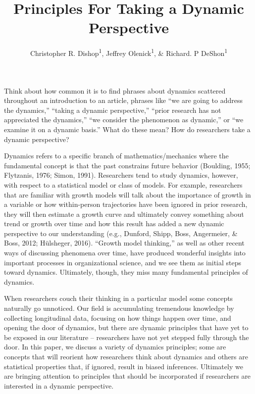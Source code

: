 \documentclass[english,,man]{apa6}
\title{Principles For Taking a Dynamic Perspective}
\author{Christopher R. Dishop\textsuperscript{1}, Jeffrey
Olenick\textsuperscript{1}, \& Richard. P DeShon\textsuperscript{1}}
\date{}
\affiliation{
\vspace{0.5cm}
\textsuperscript{1} Michigan State University}
\theoremstyle{definition}
\theoremstyle{definition}
\theoremstyle{definition}
\theoremstyle{remark}
\begin{document}
\maketitle

Think about how common it is to find phrases about dynamics scattered
throughout an introduction to an article, phrases like \enquote{we are
going to address the dynamics,} \enquote{taking a dynamic perspective,}
\enquote{prior research has not appreciated the dynamics,} \enquote{we
consider the phenomenon as dynamic,} or \enquote{we examine it on a
dynamic basis.} What do these mean? How do researchers take a dynamic
perspective?

Dynamics refers to a specific branch of mathematics/mechanics where the
fundamental concept is that the past constrains future behavior
(Boulding, 1955; Flytzanis, 1976; Simon, 1991). Researchers tend to
study dynamics, however, with respect to a statistical model or class of
models. For example, researchers that are familiar with growth models
will talk about the importance of growth in a variable or how
within-person trajectories have been ignored in prior research, they
will then estimate a growth curve and ultimately convey something about
trend or growth over time and how this result has added a new dynamic
perspective to our understanding (e.g., Dunford, Shipp, Boss,
Angermeier, \& Boss, 2012; Hülsheger, 2016). \enquote{Growth model
thinking,} as well as other recent ways of discussing phenomena over
time, have produced wonderful insights into important processes in
organizational science, and we see them as initial steps toward
dynamics. Ultimately, though, they miss many fundamental principles of
dynamics.

When researchers couch their thinking in a particular model some
concepts naturally go unnoticed. Our field is accumulating tremendous
knowledge by collecting longitudinal data, focusing on how things happen
over time, and opening the door of dynamics, but there are dynamic
principles that have yet to be exposed in our literature -- researchers
have not yet stepped fully through the door. In this paper, we discuss a
variety of dynamics principles; some are concepts that will reorient how
researchers think about dynamics and others are statistical properties
that, if ignored, result in biased inferences. Ultimately we are
bringing attention to principles that should be incorporated if
researchers are interested in a dynamic perspective.
\end{document}
